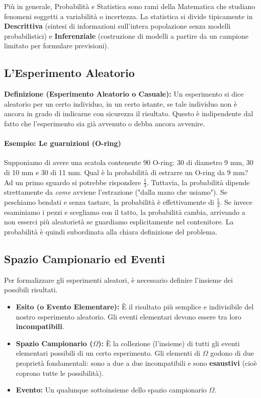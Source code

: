 \documentclass[12pt, a4paper]{article}
\begin{document}
Più in generale, Probabilità e Statistica sono rami della Matematica che studiano fenomeni soggetti a variabilità o incertezza. La statistica si divide tipicamente in \textbf{Descrittiva} (sintesi di informazioni sull'intera popolazione senza modelli probabilistici) e \textbf{Inferenziale} (costruzione di modelli a partire da un campione limitato per formulare previsioni).

\subsection{L'Esperimento Aleatorio}
\textbf{Definizione (Esperimento Aleatorio o Casuale):} Un esperimento si dice aleatorio per un certo individuo, in un certo istante, se tale individuo non è ancora in grado di indicarne con sicurezza il risultato. Questo è indipendente dal fatto che l'esperimento sia già avvenuto o debba ancora avvenire.

\paragraph{Esempio: Le guarnizioni (O-ring)}
Supponiamo di avere una scatola contenente 90 O-ring: 30 di diametro 9 mm, 30 di 10 mm e 30 di 11 mm. Qual è la probabilità di estrarre un O-ring da 9 mm? 
Ad un primo sguardo si potrebbe rispondere $\frac{1}{3}$. Tuttavia, la probabilità dipende strettamente da \textit{come} avviene l'estrazione ("dalla mano che usiamo"). Se peschiamo bendati e senza tastare, la probabilità è effettivamente di $\frac{1}{3}$. Se invece esaminiamo i pezzi e scegliamo con il tatto, la probabilità cambia, arrivando a non esserci più aleatorietà se guardiamo esplicitamente nel contenitore. 
La probabilità è quindi subordinata alla chiara definizione del problema.

\subsection{Spazio Campionario ed Eventi}
Per formalizzare gli esperimenti aleatori, è necessario definire l'insieme dei possibili risultati.

\begin{itemize}
    \item \textbf{Esito (o Evento Elementare):} È il risultato più semplice e indivisibile del nostro esperimento aleatorio. Gli eventi elementari devono essere tra loro \textbf{incompatibili}.
    \item \textbf{Spazio Campionario ($\Omega$):} È la collezione (l'insieme) di tutti gli eventi elementari possibili di un certo esperimento. Gli elementi di $\Omega$ godono di due proprietà fondamentali: sono a due a due incompatibili e sono \textbf{esaustivi} (cioè coprono tutte le possibilità).
    \item \textbf{Evento:} Un qualunque sottoinsieme dello spazio campionario $\Omega$.
\end{itemize}
\end{document}
